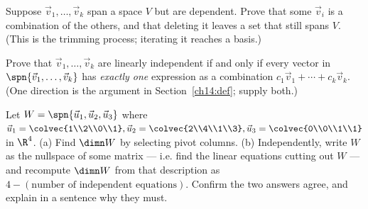 \begin{exercise}
\label{ch14:exr-shrink}
Suppose $\vec{v}_1,\dots,\vec{v}_k$ span a space $V$ but are dependent. Prove that
some $\vec{v}_i$ is a combination of the others, and that deleting it leaves a set
that still spans $V$. (This is the trimming process; iterating it reaches a
basis.)
\end{exercise}

\begin{exercise}
\label{ch14:exr-unique}
Prove that $\vec{v}_1,\dots,\vec{v}_k$ are linearly independent if and only if
every vector in $\spn\{\vec{v}_1,\dots,\vec{v}_k\}$ has \emph{exactly one}
expression as a combination $c_1\vec{v}_1+\cdots+c_k\vec{v}_k$. (One direction is
the argument in Section~\ref{ch14:def}; supply both.)
\end{exercise}

\begin{exercise}
\label{ch14:exr-challenge}
Let $W = \spn\{\vec{u}_1,\vec{u}_2,\vec{u}_3\}$ where $\vec{u}_1=\colvec{1\\2\\0\\1},
\vec{u}_2=\colvec{2\\4\\1\\3},\vec{u}_3=\colvec{0\\0\\1\\1}$ in $\R^4$. (a) Find
$\dimn W$ by selecting pivot columns. (b) Independently, write $W$ as the
nullspace of some matrix --- i.e. find the linear equations cutting out $W$ ---
and recompute $\dimn W$ from that description as $4 - (\text{number of independent
equations})$. Confirm the two answers agree, and explain in a sentence why they
must.
\end{exercise}

